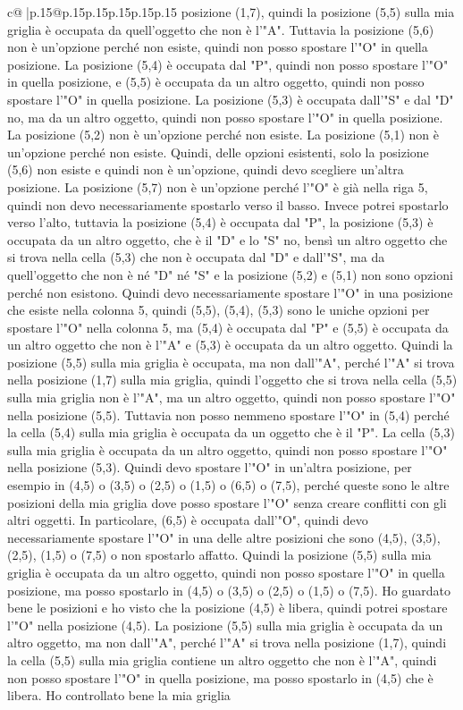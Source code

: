 \documentclass{article}
\begin{document}
{\begin{supertabular}{c@{$\;$}|p{.15\linewidth}@{}p{.15\linewidth}p{.15\linewidth}p{.15\linewidth}p{.15\linewidth}p{.15\linewidth}}
{{{posizione (1,7), quindi la posizione (5,5) sulla mia griglia è occupata da quell'oggetto che non è l'"A". Tuttavia la posizione (5,6) non è un'opzione perché non esiste, quindi non posso spostare l'"O" in quella posizione. La posizione (5,4) è occupata dal "P", quindi non posso spostare l'"O" in quella posizione, e (5,5) è occupata da un altro oggetto, quindi non posso spostare l'"O" in quella posizione. La posizione (5,3) è occupata dall'"S" e dal "D" no, ma da un altro oggetto, quindi non posso spostare l'"O" in quella posizione. La posizione (5,2) non è un'opzione perché non esiste. La posizione (5,1) non è un'opzione perché non esiste. Quindi, delle opzioni esistenti, solo la posizione (5,6) non esiste e quindi non è un'opzione, quindi devo scegliere un'altra posizione. La posizione (5,7) non è un'opzione perché l'"O" è già nella riga 5, quindi non devo necessariamente spostarlo verso il basso. Invece potrei spostarlo verso l'alto, tuttavia la posizione (5,4) è occupata dal "P", la posizione (5,3) è occupata da un altro oggetto, che è il "D" e lo "S" no, bensì un altro oggetto che si trova nella cella (5,3) che non è occupata dal "D" e dall'"S", ma da quell'oggetto che non è né "D" né "S" e la posizione (5,2) e (5,1) non sono opzioni perché non esistono. Quindi devo necessariamente spostare l'"O" in una posizione che esiste nella colonna 5, quindi (5,5), (5,4), (5,3) sono le uniche opzioni per spostare l'"O" nella colonna 5, ma (5,4) è occupata dal "P" e (5,5) è occupata da un altro oggetto che non è l'"A" e (5,3) è occupata da un altro oggetto. Quindi la posizione (5,5) sulla mia griglia è occupata, ma non dall'"A", perché l'"A" si trova nella posizione (1,7) sulla mia griglia, quindi l'oggetto che si trova nella cella (5,5) sulla mia griglia non è l'"A", ma un altro oggetto, quindi non posso spostare l'"O" nella posizione (5,5). Tuttavia non posso nemmeno spostare l'"O" in (5,4) perché la cella (5,4) sulla mia griglia è occupata da un oggetto che è il "P". La cella (5,3) sulla mia griglia è occupata da un altro oggetto, quindi non posso spostare l'"O" nella posizione (5,3). Quindi devo spostare l'"O" in un'altra posizione, per esempio in (4,5) o (3,5) o (2,5) o (1,5) o (6,5) o (7,5), perché queste sono le altre posizioni della mia griglia dove posso spostare l'"O" senza creare conflitti con gli altri oggetti. In particolare, (6,5) è occupata dall'"O", quindi devo necessariamente spostare l'"O" in una delle altre posizioni che sono (4,5), (3,5), (2,5), (1,5) o (7,5) o non spostarlo affatto. Quindi la posizione (5,5) sulla mia griglia è occupata da un altro oggetto, quindi non posso spostare l'"O" in quella posizione, ma posso spostarlo in (4,5) o (3,5) o (2,5) o (1,5) o (7,5). Ho guardato bene le posizioni e ho visto che la posizione (4,5) è libera, quindi potrei spostare l'"O" nella posizione (4,5). La posizione (5,5) sulla mia griglia è occupata da un altro oggetto, ma non dall'"A", perché l'"A" si trova nella posizione (1,7), quindi la cella (5,5) sulla mia griglia contiene un altro oggetto che non è l'"A", quindi non posso spostare l'"O" in quella posizione, ma posso spostarlo in (4,5) che è libera. Ho controllato bene la mia griglia }}}
\end{supertabular}}
\end{document}
